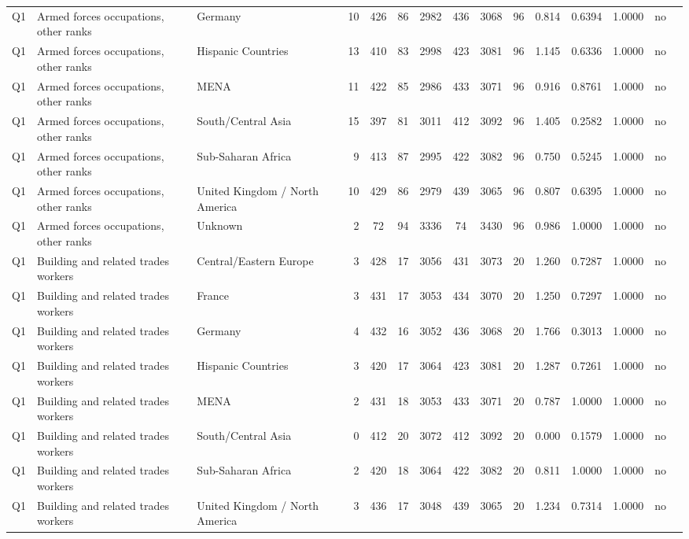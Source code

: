 \begin{longtable}{lllrcccccccccll}
Q1 & Armed forces occupations, other ranks & Germany & 10 & 426 & 86 & 2982 & 436 & 3068 & 96 & 0.814 & 0.6394 & 1.0000 & no \\
Q1 & Armed forces occupations, other ranks & Hispanic Countries & 13 & 410 & 83 & 2998 & 423 & 3081 & 96 & 1.145 & 0.6336 & 1.0000 & no \\
Q1 & Armed forces occupations, other ranks & MENA & 11 & 422 & 85 & 2986 & 433 & 3071 & 96 & 0.916 & 0.8761 & 1.0000 & no \\
Q1 & Armed forces occupations, other ranks & South/Central Asia & 15 & 397 & 81 & 3011 & 412 & 3092 & 96 & 1.405 & 0.2582 & 1.0000 & no \\
Q1 & Armed forces occupations, other ranks & Sub-Saharan Africa & 9 & 413 & 87 & 2995 & 422 & 3082 & 96 & 0.750 & 0.5245 & 1.0000 & no \\
Q1 & Armed forces occupations, other ranks & United Kingdom / North America & 10 & 429 & 86 & 2979 & 439 & 3065 & 96 & 0.807 & 0.6395 & 1.0000 & no \\
Q1 & Armed forces occupations, other ranks & Unknown & 2 & 72 & 94 & 3336 & 74 & 3430 & 96 & 0.986 & 1.0000 & 1.0000 & no \\
Q1 & Building and related trades workers & Central/Eastern Europe & 3 & 428 & 17 & 3056 & 431 & 3073 & 20 & 1.260 & 0.7287 & 1.0000 & no \\
Q1 & Building and related trades workers & France & 3 & 431 & 17 & 3053 & 434 & 3070 & 20 & 1.250 & 0.7297 & 1.0000 & no \\
Q1 & Building and related trades workers & Germany & 4 & 432 & 16 & 3052 & 436 & 3068 & 20 & 1.766 & 0.3013 & 1.0000 & no \\
Q1 & Building and related trades workers & Hispanic Countries & 3 & 420 & 17 & 3064 & 423 & 3081 & 20 & 1.287 & 0.7261 & 1.0000 & no \\
Q1 & Building and related trades workers & MENA & 2 & 431 & 18 & 3053 & 433 & 3071 & 20 & 0.787 & 1.0000 & 1.0000 & no \\
Q1 & Building and related trades workers & South/Central Asia & 0 & 412 & 20 & 3072 & 412 & 3092 & 20 & 0.000 & 0.1579 & 1.0000 & no \\
Q1 & Building and related trades workers & Sub-Saharan Africa & 2 & 420 & 18 & 3064 & 422 & 3082 & 20 & 0.811 & 1.0000 & 1.0000 & no \\
Q1 & Building and related trades workers & United Kingdom / North America & 3 & 436 & 17 & 3048 & 439 & 3065 & 20 & 1.234 & 0.7314 & 1.0000 & no \\

\end{longtable}
